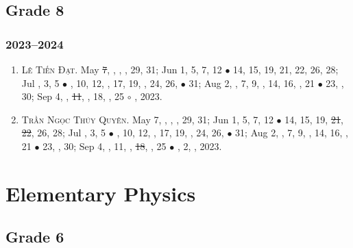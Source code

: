 \documentclass{article}
\begin{document}

\subsection{Grade 8}

\subsubsection{2023--2024}

\begin{enumerate}
	\item \textsc{Lê Tiến Đạt.} May \st{7}, , , , 29, 31; Jun 1, 5, 7, 12 $\bullet$ 14, 15, 19, 21, 22, 26, 28; Jul , 3, 5 $\bullet$ , 10, 12, , 17, 19, , 24, 26,  $\bullet$ 31; Aug 2, , 7, 9, , 14, 16, , 21 $\bullet$ 23, , 30; Sep 4, , \st{11}, , 18, , 25 $\circ$ , 2023. {\sf[Out]}
	\item \textsc{Trần Ngọc Thúy Quyên.} May 7, , , , 29, 31; Jun 1, 5, 7, 12 $\bullet$ 14, 15, 19, \st{21}, \st{22}, 26, 28; Jul , 3, 5 $\bullet$ , 10, 12, , 17, 19, , 24, 26,  $\bullet$ 31; Aug 2, , 7, 9, , 14, 16, , 21 $\bullet$ 23, , 30; Sep 4, , 11, , \st{18}, , 25 $\bullet$ , 2, , 2023.
\end{enumerate}


\section{Elementary Physics}

\subsection{Grade 6}
\end{document}

